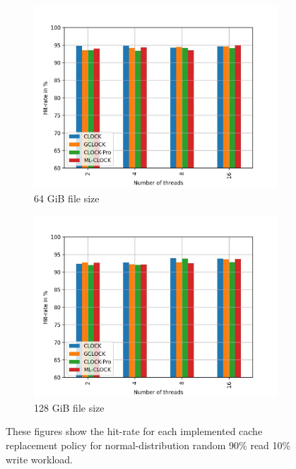\documentclass[
	12pt,
	a4paper,
	abstract,
	bibliography=totoc,
	chapterprefix,
	headings=openright,
	numbers=endperiod,
	parskip=half,
	twoside,
]{scrreprt}
\begin{document}
\begin{figure}[H]
\begin{subfigure}{0.4\textwidth}
		\includegraphics[width=\textwidth]{multi_64_gb_rw_90to10_normal.jpg}		
		\caption{64 GiB file size}
		\label{fig:rw_90to10  zoned}
	\end{subfigure}
	\hfill
	\begin{subfigure}{0.4\textwidth}
		\includegraphics[width=\textwidth]{multi_128_gb_rw_90to10_normal.jpg}		
		\caption{128 GiB file size}
		\label{fig:rw_90to10  uniform}
	\end{subfigure}
	\caption{These figures show the hit-rate for each implemented cache replacement policy for normal-distribution random 90\% read 10\% write workload.}
\end{figure}
\end{document}
